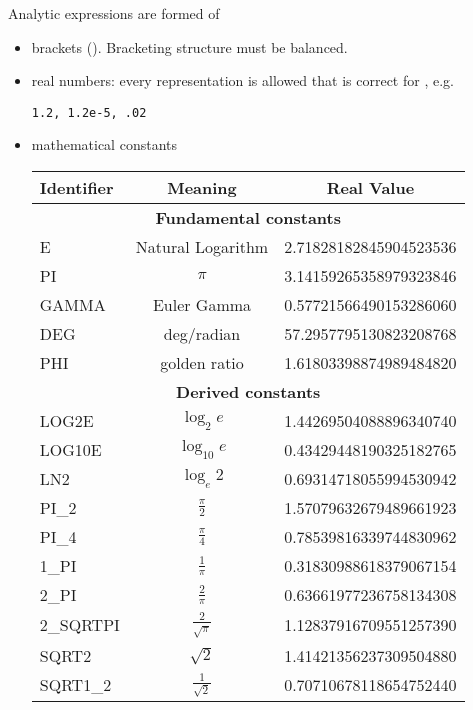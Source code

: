 Analytic expressions are formed of
\begin{itemize}
\item brackets {{{()}}}. Bracketing structure must be balanced.
\item real numbers: every representation is allowed that is correct for
, e.g.
\begin{lstlisting}[style=XMLStyle]
   1.2, 1.2e-5, .02
\end{lstlisting}
\item mathematical constants
\begin{center}
\begin{tabular}{lcc}
\toprule
Identifier & Meaning & Real Value \\
\midrule
\multicolumn{3}{c}{\textbf{Fundamental constants}} \\
E           & Natural Logarithm     & 2.71828182845904523536 \\
PI          & $\pi$                 & 3.14159265358979323846 \\
GAMMA       & Euler Gamma           & 0.57721566490153286060 \\
DEG         & deg/radian            & 57.2957795130823208768 \\
PHI         & golden ratio          & 1.61803398874989484820 \\
\multicolumn{3}{c}{\textbf{Derived constants}} \\
LOG2E       & $\log_2 e$            & 1.44269504088896340740 \\
LOG10E      & $\log_{10} e$         & 0.43429448190325182765 \\
LN2         & $\log_e 2$            & 0.69314718055994530942 \\
PI\_2       & $\frac{\pi}{2}$       & 1.57079632679489661923 \\
PI\_4       & $\frac{\pi}{4}$       & 0.78539816339744830962 \\
1\_PI       & $\frac{1}{\pi}$       & 0.31830988618379067154 \\
2\_PI       & $\frac{2}{\pi}$       & 0.63661977236758134308 \\
2\_SQRTPI   & $\frac{2}{\sqrt{\pi}}$& 1.12837916709551257390 \\
SQRT2       & $\sqrt{2}$            & 1.41421356237309504880 \\
SQRT1\_2    & $\frac{1}{\sqrt{2}}$  & 0.70710678118654752440 \\
\bottomrule
\end{tabular}
\end{center}


\end{itemize}
